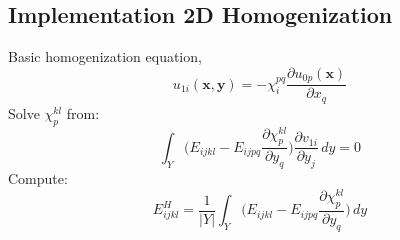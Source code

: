 \documentclass[10pt]{article}
\begin{document}
\subsection{Implementation 2D Homogenization}
Basic homogenization equation, 
\begin{equation}
u_{1i}(\textbf{x},\textbf{y}) = -\chi^{pq}_i\frac{\partial u_{0p}(\textbf{x})}{\partial x_q}
\end{equation}
Solve $\chi^{kl}_p$ from:
\begin{equation}
\int_Y \bigg ( E_{ijkl} - E_{ijpq}\frac{\partial\chi^{kl}_p}{\partial y_q}\bigg ) \frac{\partial v_{1i}}{\partial y_j}\,dy = 0
\end{equation}
Compute:
\begin{equation}\label{homoE}
E_{ijkl}^H=\frac{1}{|Y|}\int_Y\bigg (E_{ijkl} - E_{ijpq}\frac{\partial\chi^{kl}_p}{\partial y_q}\bigg )\,dy
\end{equation}
\end{document}
